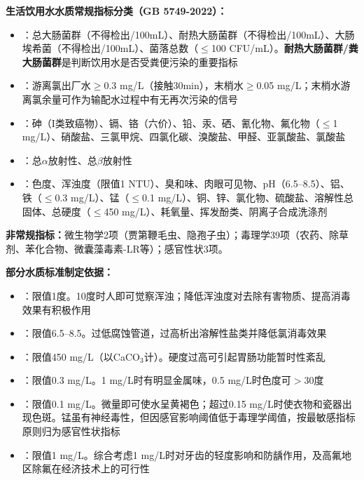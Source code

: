 \begin{tipbox}
\textbf{生活饮用水水质常规指标分类（GB 5749-2022）：}
\begin{itemize}[leftmargin=*]
    \item {}：总大肠菌群（不得检出/100mL）、耐热大肠菌群（不得检出/100mL）、大肠埃希菌（不得检出/100mL）、菌落总数（$\leq$100 CFU/mL）。\textbf{耐热大肠菌群/粪大肠菌群}是判断饮用水是否受粪便污染的重要指标
    \item {}：游离氯出厂水$\geq$0.3 mg/L（接触30min），末梢水$\geq$0.05 mg/L；末梢水游离氯余量可作为输配水过程中有无再次污染的信号
    \item {}：砷（I类致癌物）、镉、铬（六价）、铅、汞、硒、氰化物、氟化物（$\leq$1 mg/L）、硝酸盐、三氯甲烷、四氯化碳、溴酸盐、甲醛、亚氯酸盐、氯酸盐
    \item {}：总$\alpha$放射性、总$\beta$放射性
    \item {}：色度、浑浊度（限值1 NTU）、臭和味、肉眼可见物、pH（6.5--8.5）、铝、铁（$\leq$0.3 mg/L）、锰（$\leq$0.1 mg/L）、铜、锌、氯化物、硫酸盐、溶解性总固体、总硬度（$\leq$450 mg/L）、耗氧量、挥发酚类、阴离子合成洗涤剂
\end{itemize}

\textbf{非常规指标：}微生物学2项（贾第鞭毛虫、隐孢子虫）；毒理学39项（农药、除草剂、苯化合物、微囊藻毒素-LR等）；感官性状3项。
\end{tipbox}

\begin{tipbox}
\textbf{部分水质标准制定依据：}
\begin{itemize}[leftmargin=*]
    \item {}：限值1度。10度时人即可觉察浑浊；降低浑浊度对去除有害物质、提高消毒效果有积极作用
    \item {}：限值6.5--8.5。过低腐蚀管道，过高析出溶解性盐类并降低氯消毒效果
    \item {}：限值450 mg/L（以CaCO$_3$计）。硬度过高可引起胃肠功能暂时性紊乱
    \item {}：限值0.3 mg/L。1 mg/L时有明显金属味，0.5 mg/L时色度可$>$30度
    \item {}：限值0.1 mg/L。微量即可使水呈黄褐色；超过0.15 mg/L时使衣物和瓷器出现色斑。锰虽有神经毒性，但因感官影响阈值低于毒理学阈值，按最敏感指标原则归为感官性状指标
    \item {}：限值1 mg/L。综合考虑1 mg/L时对牙齿的轻度影响和防龋作用，及高氟地区除氟在经济技术上的可行性
\end{itemize}
\end{tipbox}

